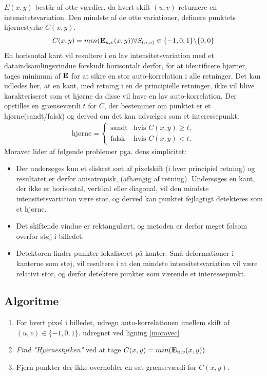 $E(x,y)$ består af otte værdier, da hvert skift $(u,v)$ returnere en intensitetsvariation. Den mindste af de otte variationer, definere punktets hjørnestyrke $C(x,y)$.
$$
C(x,y)=min(\bold{E}_{u,v}(x,y)) \forall S_{(u,v)} \in \lbrace-1,0,1\rbrace \backslash \lbrace0,0\rbrace
$$
En horisontal kant vil resultere i en lav intensitetsvariation med et dataindsamlingsvindue forskudt horisontalt derfor, for at identificere hjørner, tages minimum af $\bold{E}$ for at sikre en stor auto-korrelation i alle retninger.
Det kan udledes her, at en kant, med retning i en de principielle retninger, ikke vil blive karakteriseret som et hjørne da disse vil have  en lav auto-korrelation. Der opstilles en grænseværdi $t$ for $C$, der bestemmer om punktet er et hjørne(sandt/falsk) og derved om det kan udvælges som et interessepunkt.
\begin{equation}
\begin{split}
\text{hjørne} = 
\begin{cases}
\text{sandt}& \text{hvis } C(x,y)\geq t, \\
\text{falsk }& \text{hvis } C(x,y) < t.
\end{cases}
\end{split}
\label{cornerind}
\end{equation}
Moravec lider af følgende problemer pga. dens simplicitet:
\begin{itemize}
\item{Der undersøges kun et diskret sæt af pixelskift (i hver principiel retning) og resultatet er derfor anisotropisk, (afhængig af retning). Undersøges en kant, der ikke er horisontal, vertikal eller diagonal, vil den mindste intensitetsvariation være stor, og derved kan punktet fejlagtigt detekteres som et hjørne.}
\item{Det skiftende vindue er rektangulært, og metoden er derfor meget følsom overfor støj i billedet.}
\item{Detektoren finder punkter lokaliseret på kanter. Små deformationer i kanterne som støj, vil resultere i at den mindste intensitetsvariation vil være relativt stor, og derfor detektere punktet som værende et interessepunkt.}
\end{itemize}
\subsection*{Algoritme}
\begin{enumerate}
\item{For hvert pixel i billedet, udregn auto-korrelationen imellem skift af $(u,v) \in \lbrace-1,0,1\rbrace$. udregnet ved ligning \ref{moravec}}
\item{\textit{Find "Hjørnestyrken"} ved at tage $C(x,y)=min(\bold{E}_{u,v}(x,y))$}
\item{Fjern punkter der ikke overholder en sat grænseværdi for $C(x,y)$.}
\end{enumerate}
